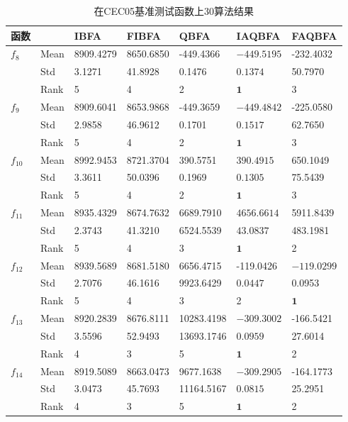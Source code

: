\begin{table*}[htb]
\caption{在CEC05基准测试函数上30算法结果}
\vspace{0.5em}\centering
\begin{tabularx}{0.9\textwidth}{p{1cm}p{1cm}p{1.6cm}p{1.5cm}p{1.75cm}p{2.15cm}p{1.5cm}}
\hline
函数&  &  IBFA &  FIBFA&  QBFA&  IAQBFA &FAQBFA\\
\midrule
$f_8$&  Mean &8909.4279       &8650.6850   & -449.4366  &$\bm{-449.5195}$   & -232.4032\\
 &  Std&  3.1271      &41.8928     &  0.1476     & $\bm{0.1374}$  &50.7970\\
 &  Rank&5    &4   & 2  & $\bm{1}$&3 \\
$f_{9}$&  Mean   &8909.6041   &8653.9868  &-449.3659  &$\bm{-449.4842}$  &-225.0580\\
 &  Std&2.9858   &46.9612  & 0.1701   & $\bm{0.1517}$  &62.7650\\
 &  Rank&5   &4  &2   &$\bm{1}$  &3   \\
$f_{10}$&  Mean&8992.9453   &8721.3704   & 390.5751    &$\bm{390.4915}$   &650.1049\\
 &  Std&3.3611   &50.0396  & 0.1969 &$\bm{0.1305}$   &75.5439\\
 &  Rank&5   & 4  &2& $\bm{1}$ &3  \\
$f_{11}$&  Mean&8935.4329   &8674.7632   &6689.7910   &$\bm{4656.6614}$   &5911.8439\\
 &  Std&2.3743   &41.3210  &6524.5539   &$\bm{43.0837}$   &483.1981\\
 &  Rank&5  &4   & 3   & $\bm{1}$  &2   \\
$f_{12}$&  Mean&8939.5689&8681.5180   & 6656.4715   &-119.0426   &$\bm{-119.0299}$\\
 &  Std&2.7076   &46.1616  &9923.6429  &$\bm{0.0447}$   &0.0953\\
 &  Rank&5   &4  &3   &2   &$\bm{1}$    \\
$f_{13}$&  Mean&8920.2839   &8676.8111   &10283.4198   &$\bm{-309.3002}$    &-166.5421\\
 &  Std&3.5596   &52.9493  & 13693.1746  &$\bm{0.0959}$   &27.6014\\
 &  Rank&4   & 3  & 5   &$\bm{1}$  &2   \\
$f_{14}$&  Mean&8919.5089   &8663.0473   &9677.1638  &$\bm{-309.2905}$  &-164.1773\\
 &  Std&3.0473  &45.7693  &11164.5167 &$\bm{0.0815}$   &25.2951\\
 &  Rank&4   &3  &5   &$\bm{1}$   &2 \\
\hline
\end{tabularx}
\label{tab:CEC05results}
\end{table*}

